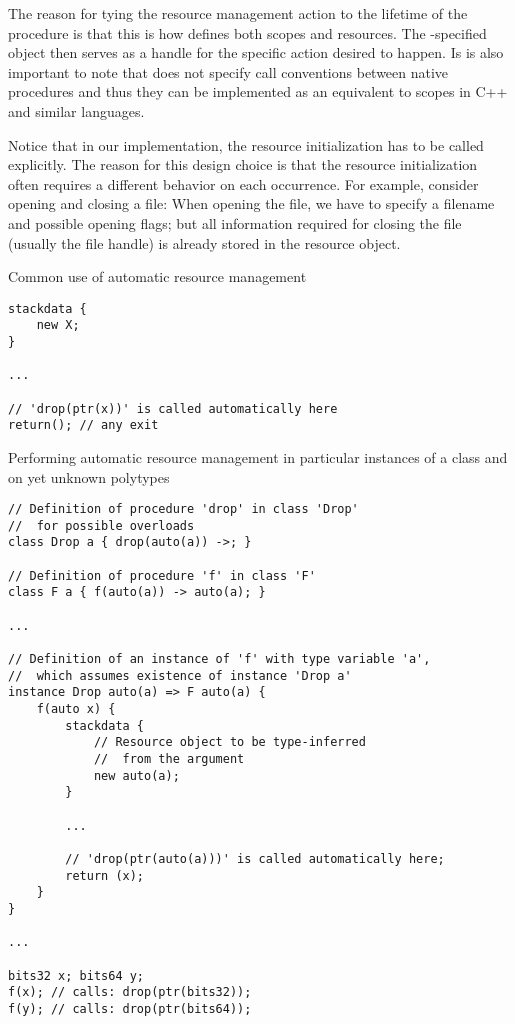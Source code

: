 The reason for tying the resource management action to the lifetime of the procedure is that this is how \cmm defines both scopes and resources. The -specified object then serves as a handle for the specific action desired to happen. Is is also important to note that \cmm does not specify call conventions between native \cmm procedures and thus they can be implemented as an equivalent to scopes in C++ and similar languages.

Notice that in our implementation, the resource initialization has to be called explicitly. The reason for this design choice is that the resource initialization often requires a different behavior on each occurrence. For example, consider opening and closing a file: When opening the file, we have to specify a filename and possible opening flags; but all information required for closing the file (usually the file handle) is already stored in the resource object.

\begin{codex}
    \caption{Common use of automatic resource management}
    \label{lst:commonResource}
    \begin{lstlisting}
stackdata {
    new X;
}

...

// 'drop(ptr(x))' is called automatically here
return(); // any exit
    \end{lstlisting}
\end{codex}

\begin{codex}
    \caption{Performing automatic resource management in particular instances of a class and on yet unknown polytypes}
    \label{lst:polyResourceEx}
    \begin{lstlisting}
// Definition of procedure 'drop' in class 'Drop'
//  for possible overloads
class Drop a { drop(auto(a)) ->; }

// Definition of procedure 'f' in class 'F'
class F a { f(auto(a)) -> auto(a); }

...

// Definition of an instance of 'f' with type variable 'a',
//  which assumes existence of instance 'Drop a'
instance Drop auto(a) => F auto(a) {
    f(auto x) {
        stackdata {
            // Resource object to be type-inferred
            //  from the argument
            new auto(a);
        }

        ...

        // 'drop(ptr(auto(a)))' is called automatically here;
        return (x);
    }
}

...

bits32 x; bits64 y;
f(x); // calls: drop(ptr(bits32));
f(y); // calls: drop(ptr(bits64));
    \end{lstlisting}
\end{codex}


